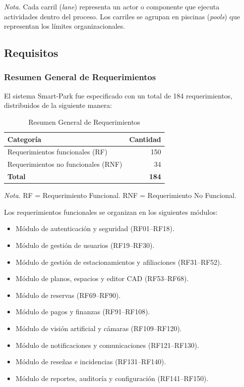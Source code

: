 \textit{Nota.} Cada carril (\textit{lane}) representa un actor o componente que ejecuta actividades dentro del proceso. Los carriles se agrupan en piscinas (\textit{pools}) que representan los límites organizacionales.

\newpage\subsection{Requisitos}

\subsubsection{Resumen General de Requerimientos}

El sistema Smart-Park fue especificado con un total de 184 requerimientos, distribuidos de la siguiente manera:

\begin{longtable}{p{10cm} r}
\caption{Resumen General de Requerimientos} \\
\toprule
\textbf{Categoría} & \textbf{Cantidad} \\
\midrule
\endfirsthead

\bottomrule
\endlastfoot

Requerimientos funcionales (RF) & 150 \\
Requerimientos no funcionales (RNF) & 34 \\
\midrule
\textbf{Total} & \textbf{184} \\
\end{longtable}

\textit{Nota.} RF = Requerimiento Funcional. RNF = Requerimiento No Funcional.

Los requerimientos funcionales se organizan en los siguientes módulos:

\begin{itemize}
    \item Módulo de autenticación y seguridad (RF01--RF18).
    \item Módulo de gestión de usuarios (RF19--RF30).
    \item Módulo de gestión de estacionamientos y afiliaciones (RF31--RF52).
    \item Módulo de planos, espacios y editor CAD (RF53--RF68).
    \item Módulo de reservas (RF69--RF90).
    \item Módulo de pagos y finanzas (RF91--RF108).
    \item Módulo de visión artificial y cámaras (RF109--RF120).
    \item Módulo de notificaciones y comunicaciones (RF121--RF130).
    \item Módulo de reseñas e incidencias (RF131--RF140).
    \item Módulo de reportes, auditoría y configuración (RF141--RF150).
\end{itemize}

